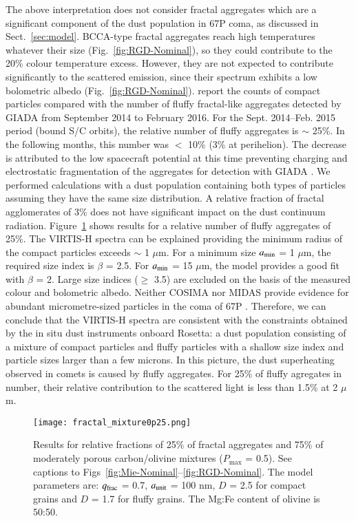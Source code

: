 \documentclass[a4paper,fleqn,usenatbib]{mnras}
\begin{document}
The above interpretation does not consider fractal aggregates which are a significant component of the dust population in 67P coma, as discussed in Sect.~\ref{sec:model}. BCCA-type fractal aggregates reach high temperatures whatever their size (Fig.~\ref{fig:RGD-Nominal}), so they could contribute to the 20\% colour temperature excess. However, they are not expected to contribute significantly to the scattered emission, since their spectrum exhibits a low bolometric albedo  (Fig.~\ref{fig:RGD-Nominal}). \citet{Dellacorte2016} report the counts of compact particles compared with the number of fluffy fractal-like aggregates detected by GIADA from September 2014 to  February 2016. For the Sept. 2014--Feb. 2015 period (bound S/C orbits), the relative number of fluffy aggregates is $\sim$ 25\%. In the following months, this number was
$<$ 10\% (3\% at perihelion). The decrease  is  attributed to the low spacecraft potential at this time preventing charging and electrostatic fragmentation of the aggregates for detection with GIADA \citep[][Fulle, personal communication]{Fulle2015}.  We performed calculations with a dust population containing both types of particles assuming they have the same size distribution. A relative fraction of fractal agglomerates of 3\%
does not have significant impact on the dust continuum radiation. Figure~\ref{fig:fluffy} shows results for a relative number of fluffy aggregates of 25\%. The VIRTIS-H spectra can be explained providing the minimum radius of the compact particles exceeds $\sim$ 1 $\mu$m. For a minimum size
$a_{\rm min}$ = 1 $\mu$m, the required size index is $\beta$ = 2.5. For $a_{\rm min}$ = 15 $\mu$m, the model provides a good fit with $\beta$ = 2. Large size indices ($\geq$ 3.5) are excluded on the basis of the measured colour and bolometric albedo. Neither COSIMA nor MIDAS provide evidence for abundant micrometre-sized particles in the coma of 67P \citep{Merouane2016,Mannel2016}. Therefore, we can conclude that the VIRTIS-H spectra are consistent with the constraints obtained by the in situ dust instruments onboard Rosetta: a dust population consisting of a mixture of compact particles and fluffy particles with a shallow size index and particle sizes larger than a few microns.
In this picture, the dust superheating observed in comets is caused by fluffy aggregates. For 25\% of fluffy agregates in number, their relative contribution to the scattered light is less than 1.5\% at 2 $\mu$m.

   \begin{figure}
   \texttt{[image: fractal\_mixture0p25.png]}
    \caption{Results for relative fractions of 25\% of fractal aggregates and 75\% of moderately porous carbon/olivine mixtures ($P_{\max}$ = 0.5). See captions to Figs~\ref{fig:Mie-Nominal}--\ref{fig:RGD-Nominal}. The model parameters are: $q_{\rm frac}$ = 0.7, $a_{\rm unit}$ = 100 nm, $D$ = 2.5 for compact grains and $D$ = 1.7 for fluffy grains. The Mg:Fe content of olivine is 50:50.}
    \label{fig:fluffy}
   \end{figure}
\end{document}
